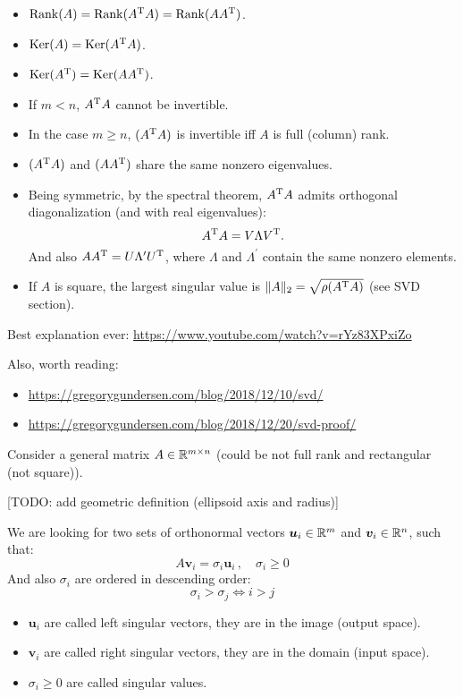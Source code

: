 \documentclass[
  12pt,
  paper=a4,
]{scrartcl} %
\begin{document}
\begin{itemize}
    \item $\operatorname{Rank}(A) = \operatorname{Rank}(A^{\mathrm{T}} A) = \operatorname{Rank}(AA^{\mathrm{T}} )$.
    \item $\operatorname{Ker}(A) = \operatorname{Ker}(A^{\mathrm{T}} A)$.
    \item $\operatorname{Ker}(A^{\mathrm{T}}) = \operatorname{Ker}(AA^{\mathrm{T}} )$.
    \item If $m < n$, $A^{\mathrm{T}} A$ cannot be invertible.
    \item In the case $m\ge n$, $(A^{\mathrm{T}} A)$ is invertible iff $A$ is full (column) rank.

    \item $(A^{\mathrm{T}} A)$ and $(A A ^{\mathrm{T}})$ share the same nonzero eigenvalues.

    \item Being symmetric, by the spectral theorem, $A^{\mathrm{T}} A$ admits orthogonal diagonalization (and with real eigenvalues): \[A^{\mathrm{T}} A = V\Lambda V^{\mathrm{T}}.\] And also $A A ^{\mathrm{T}} = U\Lambda^{\prime} U^{\mathrm{T}}$, where $\Lambda$ and $\Lambda^{\prime}$ contain the same nonzero elements.
    
    \item If $A$ is square, the largest singular value is $\|A\|_2 = \sqrt{\rho(A^{\mathrm{T}} A)}$ (see SVD section).

\end{itemize}


Best explanation ever: \url{https://www.youtube.com/watch?v=rYz83XPxiZo}

Also, worth reading:
\begin{itemize}
    \item \url{https://gregorygundersen.com/blog/2018/12/10/svd/}
    \item \url{https://gregorygundersen.com/blog/2018/12/20/svd-proof/}
\end{itemize}
\vspace{0.5em}

Consider a general matrix $A \in \mathbb R^{m\times n}$ (could be not full rank and rectangular (not square)).

[TODO: add geometric definition (ellipsoid axis and radius)]

We are looking for two sets of orthonormal vectors $\bm u_i \in \mathbb R^{m}$ and $\bm v_i \in \mathbb R^n$, such that:
\[A\bm v_i = \sigma_i \bm u_i\,, \quad \sigma_i \ge 0\]
And also $\sigma_i$ are ordered in descending order:
\[ \sigma_i > \sigma_j \iff i > j \]

\begin{itemize}
    \item $\bm u_i$ are called left singular vectors, they are in the image (output space).
    \item $\bm v_i$ are called right singular vectors, they are in the domain  (input space).
    \item $\sigma_i \ge 0$ are called singular values.
\end{itemize}
\end{document}
